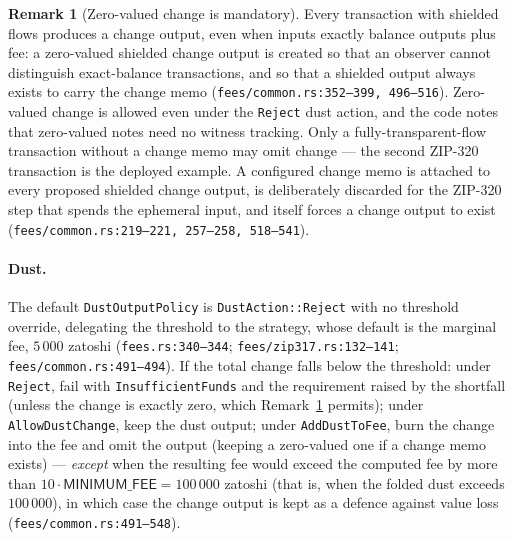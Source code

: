 \documentclass[11pt,a4paper]{article}
\theoremstyle{definition}
\newtheorem{remark}[theorem]{Remark}
\begin{document}
\begin{remark}[Zero-valued change is mandatory]\label{rem:zero-change}
Every transaction with shielded flows produces a change output, even when
inputs exactly balance outputs plus fee: a zero-valued shielded change
output is created so that an observer cannot distinguish exact-balance
transactions, and so that a shielded output always exists to carry the
change memo (\texttt{fees/common.rs:352--399, 496--516}). Zero-valued change
is allowed even under the \texttt{Reject} dust action, and the code notes
that zero-valued notes need no witness tracking. Only a
fully-transparent-flow transaction without a change memo may omit change ---
the second ZIP-320 transaction is the deployed example. A configured change
memo is attached to every proposed shielded change output, is deliberately
discarded for the ZIP-320 step that spends the ephemeral input, and itself
forces a change output to exist (\texttt{fees/common.rs:219--221, 257--258,
518--541}).
\end{remark}

\paragraph{Dust.} The default \texttt{DustOutputPolicy} is
\texttt{DustAction::Reject} with no threshold override, delegating the
threshold to the strategy, whose default is the marginal fee, $5\,000$
zatoshi (\texttt{fees.rs:340--344}; \texttt{fees/zip317.rs:132--141};
\texttt{fees/common.rs:491--494}). If the total change falls below the
threshold: under \texttt{Reject}, fail with \texttt{InsufficientFunds} and
the requirement raised by the shortfall (unless the change is exactly zero,
which Remark~\ref{rem:zero-change} permits); under
\texttt{AllowDustChange}, keep the dust output; under \texttt{AddDustToFee},
burn the change into the fee and omit the output (keeping a zero-valued one
if a change memo exists) --- \emph{except} when the resulting fee would
exceed the computed fee by more than
$10 \cdot \mathsf{MINIMUM\_FEE} = 100\,000$ zatoshi (that is, when the
folded dust exceeds $100\,000$), in which case the change output is kept
as a defence against value loss (\texttt{fees/common.rs:491--548}).
\end{document}
